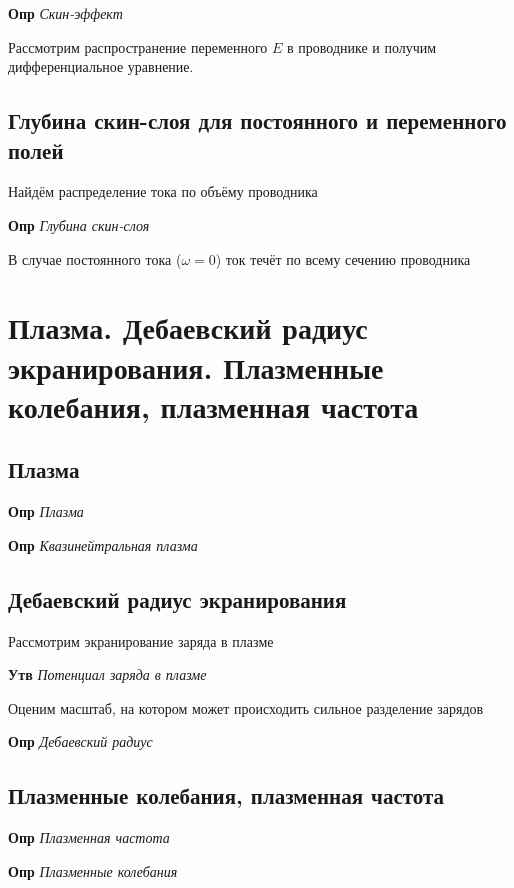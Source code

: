 \documentclass[a4paper, 14pt]{article}
\begin{document}
    \textbf{Опр} \textit{Скин-эффект}
    
    Рассмотрим распространение переменного $E$ в проводнике и получим дифференциальное уравнение.
    
    \subsection{Глубина скин-слоя для постоянного и переменного полей}
    
    Найдём распределение тока по объёму проводника
    
    \textbf{Опр} \textit{Глубина скин-слоя}
    
    В случае постоянного тока ($\omega = 0$) ток течёт по всему сечению проводника
    
    \section{Плазма.
    Дебаевский радиус экранирования.
    Плазменные колебания, плазменная частота}
    
    \subsection{Плазма}
    
    \textbf{Опр} \textit{Плазма}
    
    \textbf{Опр} \textit{Квазинейтральная плазма}
    
    \subsection{Дебаевский радиус экранирования}
    
    Рассмотрим экранирование заряда в плазме
    
    \textbf{Утв} \textit{Потенциал заряда в плазме}
    
    Оценим масштаб, на котором может происходить сильное разделение зарядов
    
    \textbf{Опр} \textit{Дебаевский радиус}
    
    \subsection{Плазменные колебания, плазменная частота}
    
    \textbf{Опр} \textit{Плазменная частота}
    
    \textbf{Опр} \textit{Плазменные колебания}
    
\end{document}
